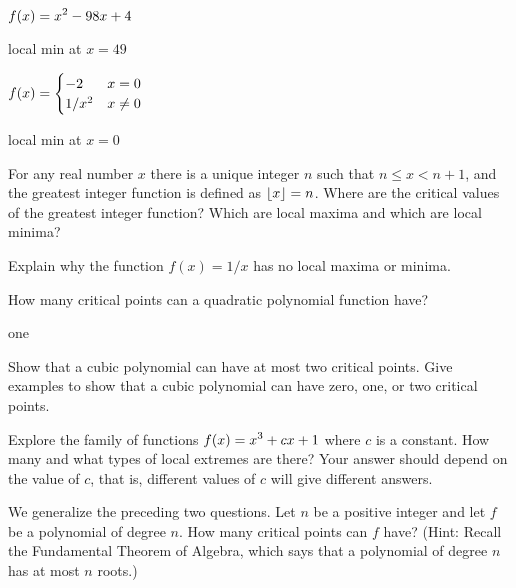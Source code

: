 \begin{exercises}
\exercise $\displaystyle f(x) = x^2 - 98x + 4$
\begin{answer} local min at $x=49$
\end{answer}

\exercise $\displaystyle f(x) =\begin{cases} -2 & x = 0  \\
1/x^2 & x \neq 0 \end{cases}$
\begin{answer} local min at $x=0$
\end{answer}

\endtwocol
\bsk
\exercise  For any real number $x$ there is a unique
  integer $n$ such that $n \leq x < n +1$, and the greatest
  integer function is defined as $\displaystyle\lfloor
  x\rfloor = n$. Where
  are the critical values of the greatest integer function?  Which are
  local maxima and which are local minima?

\exercise Explain why the function $f(x) =1/x$ has no local
maxima or minima.

\exercise How many critical points can a quadratic polynomial function have?
\begin{answer} one
\end{answer}

\exercise Show that a cubic polynomial can have at most two critical
points. Give examples to show that a cubic polynomial can have zero,
one, or two critical points.

\exercise Explore the family of functions $\displaystyle f(x) = x^3 + cx +1$ where $c$
 is a constant.  How many and what types of local extremes are there?
 Your answer should depend on the value of $c$, that is, different
 values of $c$ will give different answers.

\exercise We generalize the preceding two questions. Let $n$ be a
positive integer and let $f$ be a polynomial of degree $n$. How many
critical points can $f$ have? (Hint: Recall the {\dfont Fundamental
  Theorem of Algebra}, 
which says that a polynomial of degree $n$ has
  at most $n$ roots.)

\end{exercises}

